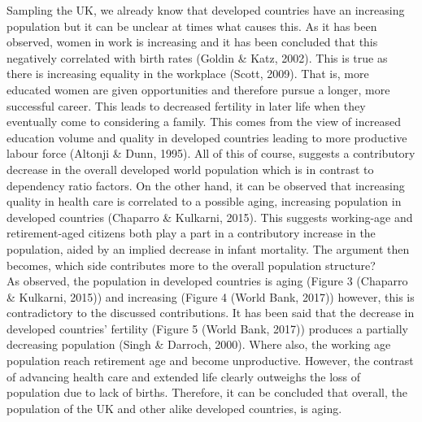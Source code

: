 \documentclass[11pt, english]{article}
\begin{document}
	Sampling the UK, we already know that developed countries have an increasing population but it can be unclear at times what causes this. As it has been observed, women in work is increasing and it has been concluded that this negatively correlated with birth rates (Goldin \& Katz, 2002). This is true as there is increasing equality in the workplace (Scott, 2009). That is, more educated women are given opportunities and therefore pursue a longer, more successful career. This leads to decreased fertility in later life when they eventually come to considering a family. This comes from the view of increased education volume and quality in developed countries leading to more productive labour force (Altonji \& Dunn, 1995). All of this of course, suggests a contributory decrease in the overall developed world population which is in contrast to dependency ratio factors. On the other hand, it can be observed that increasing quality in health care is correlated to a possible aging, increasing population in developed countries (Chaparro \& Kulkarni, 2015). This suggests working-age and retirement-aged citizens both play a part in a contributory increase in the population, aided by an implied decrease in infant mortality. The argument then becomes, which side contributes more to the overall population structure?\\

	As observed, the population in developed countries is aging (Figure 3 (Chaparro \& Kulkarni, 2015)) and increasing (Figure 4 (World Bank, 2017)) however, this is contradictory to the discussed contributions. It has been said that the decrease in developed countries’ fertility (Figure 5 (World Bank, 2017)) produces a partially decreasing population (Singh \& Darroch, 2000). Where also, the working age population reach retirement age and become unproductive. However, the contrast of advancing health care and extended life clearly outweighs the loss of population due to lack of births.  Therefore, it can be concluded that overall, the population of the UK and other alike developed countries, is aging.\\
\end{document}
